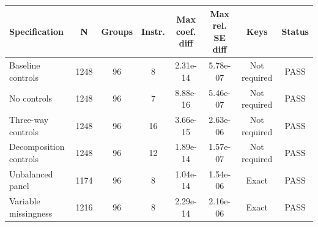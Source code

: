 \begin{tabular}{lccccccc}
\toprule
Specification & N & Groups & Instr. & Max coef. diff & Max rel. SE diff & Keys & Status \\
\midrule
Baseline controls & 1248 & 96 & 8 & 2.31e-14 & 5.78e-07 & Not required & PASS \\
No controls & 1248 & 96 & 7 & 8.88e-16 & 5.46e-07 & Not required & PASS \\
Three-way controls & 1248 & 96 & 16 & 3.66e-15 & 2.63e-06 & Not required & PASS \\
Decomposition controls & 1248 & 96 & 12 & 1.89e-14 & 1.57e-07 & Not required & PASS \\
Unbalanced panel & 1174 & 96 & 8 & 1.04e-14 & 1.54e-06 & Exact & PASS \\
Variable missingness & 1216 & 96 & 8 & 2.29e-14 & 2.16e-06 & Exact & PASS \\
\bottomrule
\end{tabular}